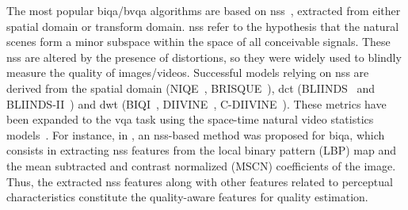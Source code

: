 \documentclass[journal]{IEEEtran}
\begin{document}
The most popular \ac{biqa}/\ac{bvqa} algorithms are based on \ac{nss}~\cite{ruderman1994statistics}, extracted from either spatial domain or transform domain. \ac{nss} refer to the hypothesis that the natural scenes form a minor subspace within the space of all conceivable signals. These \ac{nss} are altered by the presence of distortions, so they were widely used to blindly measure the quality of images/videos. Successful models relying on \ac{nss} are derived from the spatial domain  (NIQE~\cite{mittal2012no}, BRISQUE~\cite{mittal2012no}), \ac{dct} (BLIINDS~\cite{saad2010dct} and  BLIINDS-II~\cite{saad2012blind}) and \ac{dwt} (BIQI~\cite{moorthy2010two}, DIIVINE~\cite{moorthy2011blind}, C-DIIVINE~\cite{zhang2014c}). These metrics have been expanded to  the \ac{vqa} task using the space-time natural video statistics models~\cite{li2016spatiotemporal, sinno2019spatio,saad2014blind}.
For instance, in \cite{liu2020blind}, an \ac{nss}-based method was proposed for \ac{biqa}, which consists in extracting \ac{nss} features from the local binary pattern (LBP) map and the mean subtracted and contrast normalized (MSCN) coefficients of the image. Thus, the extracted \ac{nss} features along with other features related to perceptual characteristics constitute the quality-aware features for quality estimation. 
\end{document}
